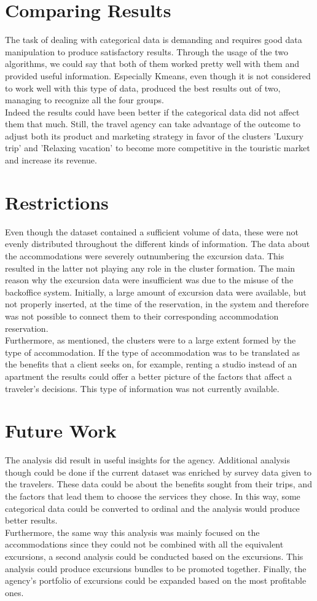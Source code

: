 \section{Comparing Results}
The task of dealing with categorical data is demanding and requires good data manipulation to produce satisfactory results. Through the usage of the two algorithms, we could say that both of them worked pretty well with them and provided useful information. Especially Kmeans, even though it is not considered to work well with this type of data, produced the best results out of two, managing to recognize all the four groups. \\
Indeed the results could have been better if the categorical data did not affect them that much. Still, the travel agency can take advantage of the outcome to adjust both its product and marketing strategy in favor of the clusters 'Luxury trip' and 'Relaxing vacation' to become more competitive in the touristic market and increase its revenue.
\section{Restrictions}
Even though the dataset contained a sufficient volume of data, these were not evenly distributed throughout the different kinds of information. The data about the accommodations were severely outnumbering the excursion data. This resulted in the latter not playing any role in the cluster formation. The main reason why the excursion data were insufficient was due to the misuse of the backoffice system. Initially, a large amount of excursion data were available, but not properly inserted, at the time of the reservation, in the system and therefore was not possible to connect them to their corresponding accommodation reservation. \\
Furthermore, as mentioned, the clusters were to a large extent formed by the type of accommodation. If the type of accommodation was to be translated as the benefits that a client seeks on, for example, renting a studio instead of an apartment the results could offer a better picture of the factors that affect a traveler's decisions. This type of information was not currently available.
\section{Future Work}
The analysis did result in useful insights for the agency. Additional analysis though could be done if the current dataset was enriched by survey data given to the travelers. These data could be about the benefits sought from their trips, and the factors that lead them to choose the services they chose. In this way, some categorical data could be converted to ordinal and the analysis would produce better results. \\
Furthermore, the same way this analysis was mainly focused on the accommodations since they could not be combined with all the equivalent excursions, a second analysis could be conducted based on the excursions. This analysis could produce excursions bundles to be promoted together. Finally, the agency's portfolio of excursions could be expanded based on the most profitable ones.